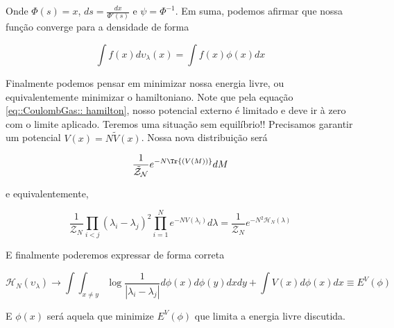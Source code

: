 Onde $\Phi(s) = x$, $ds = \frac{dx}{\Phi'(s)}$ e $\psi = \Phi^{-1}$. Em suma, podemos afirmar que nossa função converge para a densidade de forma

\[
\int f(x) d\upsilon_\lambda(x) =  \int f(x) \phi(x) dx
\]

Finalmente podemos pensar em minimizar nossa energia livre, ou equivalentemente minimizar o hamiltoniano. Note que pela equação \ref{eq::CoulombGas:: hamilton}, nosso potencial externo é limitado e deve ir à zero com o limite aplicado. Teremos uma situação sem equilíbrio!! Precisamos garantir um potencial $V(x) = N\tilde{V}(x)$. Nossa nova distribuição será

\[
	\frac{1}{\mathcal{\tilde{Z}_N}} e^{-N\Tr{(V(M))}} dM
\]

e equivalentemente,

\[
	\frac{1}{\mathcal{Z}_N} \prod_{i<j} (\lambda_i - \lambda_j)^2 \prod_{i=1}^{N} e^{-NV(\lambda_i)} d\lambda = 	\frac{1}{\mathcal{Z}_N}  e^{-N^2 \mathcal{H}_N(\lambda)}
\]

E finalmente poderemos expressar de forma correta

\begin{equation}
	\mathcal{H}_N(\upsilon_\lambda) \to \int \int_{x\neq y} \log{\frac{1}{|\lambda_i - \lambda_j|}}  d\phi(x) d\phi(y) dx dy + \int V(x) d\phi(x) dx \equiv E^V(\phi)
	\label{eq::CoulombGas:: hamilton corrected}
\end{equation}

E $\phi(x)$ será aquela que minimize $E^V(\phi)$ que limita a energia livre discutida.
